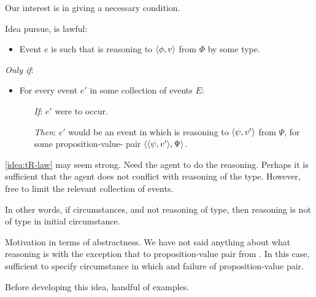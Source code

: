 \begin{note}
  Our interest is in giving a necessary condition.

  Idea pursue, \tRN{} is lawful:

  \begin{idea}
    \label{idea:tR-law}

    \begin{itemize}
    \item
      Event \(e\) is such that \vAgent{} is reasoning to \(\langle \phi, v \rangle\) from \(\Phi\) by some type.
    \end{itemize}

    \emph{Only if}:

    \begin{itemize}
    \item
      For every event \(e'\) in some collection of events \(E\):
      \begin{itemize}
      \item[\emph{If}:]
        \(e'\) were to occur.
      \item[\emph{Then}:]
        \(e'\) would be an event in which \vAgent{} is reasoning to \(\langle \psi, v' \rangle\) from \(\Psi\), for some proposition-value-\pool{} pair \(\langle \langle \psi, v' \rangle, \Psi \rangle\).
      \end{itemize}
    \end{itemize}
    \vspace{-\baselineskip}
  \end{idea}

  \autoref{idea:tR-law} may seem strong.
  Need the agent to do the reasoning.
  Perhaps it is sufficient that the agent does not conflict with reasoning of the type.
  However, free to limit the relevant collection of events.

  In other words, if circumstances, and not reasoning of type, then reasoning is not of type in initial circumstance.

  Motivation in terms of abstractness.
  We have not said anything about what reasoning is with the exception that to proposition-value pair from \pool{}.
  In this case, sufficient to specify circumstance in which \pool{} and failure of proposition-value pair.

  Before developing this idea, handful of examples.
\end{note}

